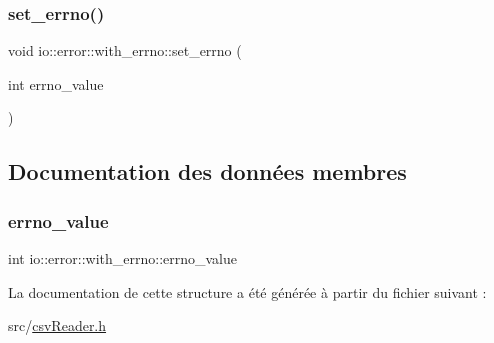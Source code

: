 \subsubsection{\texorpdfstring{set\+\_\+errno()}{set\_errno()}}
{\footnotesize\ttfamily void io\+::error\+::with\+\_\+errno\+::set\+\_\+errno (\begin{DoxyParamCaption}\item[{int}]{errno\+\_\+value }\end{DoxyParamCaption})\hspace{0.3cm}{\ttfamily [inline]}}



\subsection{Documentation des données membres}
\mbox{\label{structio_1_1error_1_1with__errno_a99dcacba02cb53351fe64d7e064406be}} 
\subsubsection{\texorpdfstring{errno\+\_\+value}{errno\_value}}
{\footnotesize\ttfamily int io\+::error\+::with\+\_\+errno\+::errno\+\_\+value}



La documentation de cette structure a été générée à partir du fichier suivant \+:\begin{DoxyCompactItemize}
\item 
src/\hyperlink{csvReader_8h}{csv\+Reader.\+h}\end{DoxyCompactItemize}
